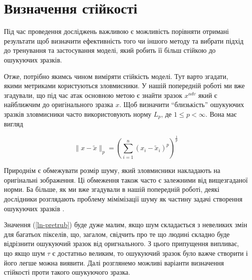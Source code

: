 \documentclass[14pt,a4paper]{extarticle}
\newcounter{e}
\numberwithin{equation}{section}
\numberwithin{figure}{section}
\begin{document}

 
 
 \newpage
 \thispagestyle{empty}
 \section{Визначення стійкості}
 \vspace{1cm}
 Під час проведення досліджень важливою є можливість порівняти отримані результати щоб визначити ефективність того чи іншого методу та вибрати підхід до тренування та застосування моделі, який робить її більш стійкою до ошукуючих зразків.
 
 Отже, потрібно якимсь чином виміряти стійкість моделі. Тут варто згадати, якими метриками користуються зловмисники. У нашій попередній роботі \cite{my-work} ми вже згадували, що під час атак основною метою є знайти зразок $x^{adv}$ який є найближчим до оригінального зразка $x$. Щоб визначити ``близькість'' ошукуючих зразків зловмисники часто використовують норму  $L_p$, де $1 \leq p<\infty$. Вона має вигляд
 
 \begin{equation}
 \label{ln-pretrub}
 \|x-\tilde{x}\|_{p}=\left(\sum_{i=1}^{n}\left(x_{i}-\tilde{x}_{i}\right)^{p}\right)^{\frac{1}{p}}
 \end{equation}
 
 Природнім є обмежувати розмір шуму, який зловмисники накладають на оригінальні зображення. Ці обмеження також часто є залежними від вищезгаданої норми. Ба більше, як ми вже згадували в нашій попередній роботі, деякі дослідники розглядають проблему мімімізації шуму як частину задачі створення ошукуючих зразків \cite{C-and-W}.
 
 Значення (\ref{ln-pretrub}) буде дуже малим, якщо шум складається з невеликих змін для багатьох пікселів, що, загалом, свідчить про те що людині складно буде відрізнити ошукуючий зразок від оригнального. З цього припущення випливає, що якщо шум $\tau$ є достатньо великим, то ошукуючий зразок було важче створити і його легше можна виявити.
 Далі розглянемо можливі варіанти визначення стійкості проти такого ошукуючого зразка.
 
\end{document}
